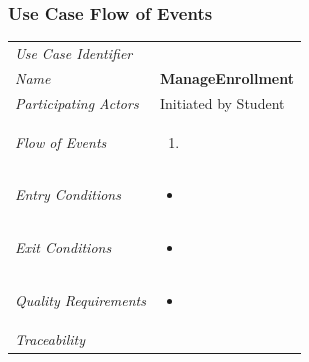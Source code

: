 \documentclass[12pt,letterpaper]{article}
\begin{document}
\subsubsection*{Use Case Flow of Events}

\begin{center}
	\begin{tabu} to 
		\toprule
		Use Case Identifier & \editprojectdetails{} \\
		Name & {\bf ManageEnrollment} \\
		Participating Actors & Initiated by Student \\
		Flow of Events & 
	    \begin{enumerate}[topsep=-1em,leftmargin=*]
		    \item 
		\end{enumerate} \\

		Entry Conditions &
		\begin{itemize}[topsep=-1em,leftmargin=*]
		    \item 
        \end{itemize} \\

		Exit Conditions &
		\begin{itemize}[topsep=-1em,leftmargin=*]
		    \item 
        \end{itemize} \\

		Quality Requirements &
		\begin{itemize}[topsep=-1em,leftmargin=*]
		    \item 
        \end{itemize} \\

		Traceability & \\
		\toprule
	\end{tabu}
\end{center}
\end{document}
